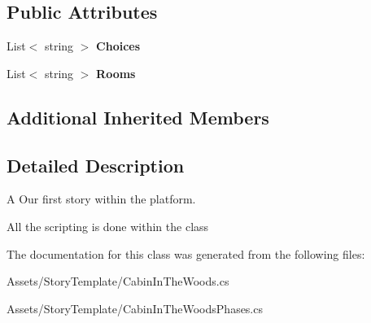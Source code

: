 \subsection*{Public Attributes}
\begin{DoxyCompactItemize}
\item 
List$<$ string $>$ {\bfseries Choices}\hypertarget{classAssets_1_1StoryTemplate_1_1CabinInTheWoods_a86f51cd85f14ea0efd4a9e5d9a5e2099}{}\label{classAssets_1_1StoryTemplate_1_1CabinInTheWoods_a86f51cd85f14ea0efd4a9e5d9a5e2099}

\item 
List$<$ string $>$ {\bfseries Rooms}\hypertarget{classAssets_1_1StoryTemplate_1_1CabinInTheWoods_a14a23d102767f6f5cbe91e03a8815cc0}{}\label{classAssets_1_1StoryTemplate_1_1CabinInTheWoods_a14a23d102767f6f5cbe91e03a8815cc0}

\end{DoxyCompactItemize}
\subsection*{Additional Inherited Members}


\subsection{Detailed Description}
A Our first story within the platform. 

All the scripting is done within the class 

The documentation for this class was generated from the following files\+:\begin{DoxyCompactItemize}
\item 
Assets/\+Story\+Template/Cabin\+In\+The\+Woods.\+cs\item 
Assets/\+Story\+Template/Cabin\+In\+The\+Woods\+Phases.\+cs\end{DoxyCompactItemize}

